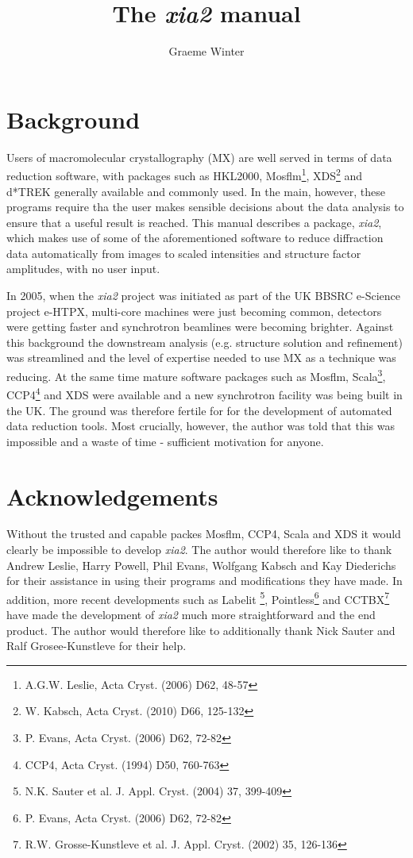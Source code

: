 \documentclass[a4paper, 11pt]{article}
\title{The \emph{xia2} manual}
\author{Graeme Winter}
\begin{document}
\maketitle
\clearpage

\tableofcontents

\section{Background}

Users of macromolecular crystallography (MX) are well served in terms of
data reduction software, with packages such as HKL2000, 
Mosflm\footnote{A.G.W. Leslie, Acta Cryst. (2006) D62, 48-57},
XDS\footnote{W. Kabsch, Acta Cryst. (2010) D66, 125-132} and 
d*TREK generally available and commonly used. In the main, however, these
programs require tha the user makes sensible decisions about the data 
analysis to ensure that a useful result is reached. This manual describes
a package, \emph{xia2}, which makes use of some of the aforementioned 
software to reduce diffraction data automatically from images to scaled 
intensities and structure factor amplitudes, with no user input.

In 2005, when the \emph{xia2} project was initiated as part of the UK BBSRC
e-Science project e-HTPX, multi-core machines were just becoming common, 
detectors were getting faster and synchrotron beamlines were becoming 
brighter. Against this background the downstream analysis (e.g. structure 
solution and refinement) was streamlined and the level of expertise needed
to use MX as a technique was reducing. At the same time mature software
packages such as Mosflm, 
Scala\footnote{P. Evans, Acta Cryst. (2006) D62, 72-82}, 
CCP4\footnote{CCP4, Acta Cryst. (1994) D50, 760-763} 
and XDS were available and a new 
synchrotron facility was being built in the UK. The ground was therefore
fertile for for the development of automated data reduction tools. Most 
crucially, however, the author was told that this was impossible and a 
waste of time - sufficient motivation for anyone.

\section{Acknowledgements}

Without the trusted and capable packes Mosflm, CCP4, Scala and XDS it would 
clearly be impossible to develop \emph{xia2}. The author would therefore
like to thank Andrew Leslie, Harry Powell, Phil Evans, Wolfgang Kabsch 
and Kay Diederichs for their assistance in using their programs and 
modifications they have made. In addition, more recent developments
such as Labelit \footnote{N.K. Sauter et al. J. Appl. Cryst. (2004) 37, 
399-409}, Pointless\footnote{P. Evans, Acta Cryst. (2006) D62, 72-82}
and CCTBX\footnote{R.W. Grosse-Kunstleve et al. J. Appl. Cryst. (2002) 35, 
126-136} have made the development of \emph{xia2} much more straightforward
and the end product. The author would therefore like to additionally thank
Nick Sauter and Ralf Grosee-Kunstleve for their help.
\end{document}
